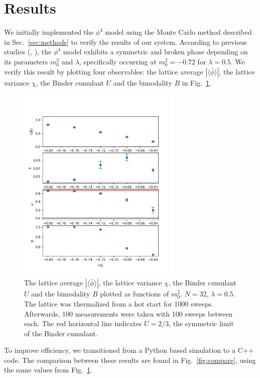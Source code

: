 \documentclass[12pt]{article}
\begin{document}
\section{Results}
We initially implemented the $\phi^4$ model using the Monte Carlo method described in Sec.~\ref{sec:methods} to verify the results of our system. According to previous studies (\cite{monahan2016}, \cite{schaich2006}), the $\phi^4$ model exhibits a symmetric and broken phase depending on its parameters $m_0^2$ and $\lambda$, specifically occurring at $m_0^2 = -0.72$ for $\lambda = 0.5$. We verify this result by plotting four observables: the lattice average $|\langle\bar\phi\rangle|$, the lattice variance $\chi$, the Binder cumulant $U$ and the bimodality $B$ in Fig.~\ref{fig:phi4}.

\begin{figure}[h]
  \centering
      \includegraphics[width=0.7\textwidth]{imgs/phi4.png}
      \caption{The lattice average $|\langle\bar\phi\rangle|$, the lattice variance $\chi$, the Binder cumulant $U$ and the bimodality $B$ plotted as functions of $m_0^2$. $N=32$, $\lambda=0.5$. The lattice was thermalized from a hot start for 1000 sweeps. Afterwards, 100 measurements were taken with 100 sweeps between each. The red horizontal line indicates $U=2/3$, the symmetric limit of the Binder cumulant.}
  \label{fig:phi4}
\end{figure}

To improve efficiency, we transitioned from a Python based simulation to a C++ code. The comparison between these results are found in Fig.~\ref{fig:compare}, using the same values from Fig.~\ref{fig:phi4}.
\end{document}
